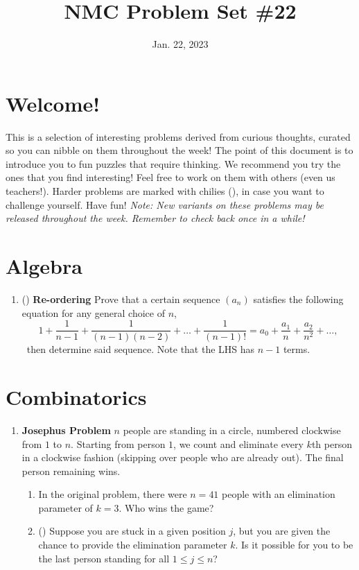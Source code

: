 \documentclass[11pt]{scrartcl}
\begin{document}
\title{NMC Problem Set \#22} %
\date{Jan. 22, 2023} %
\maketitle

\section*{Welcome!}

This is a selection of interesting problems derived from curious thoughts, curated so you can nibble on them throughout the week! The point of this document is to introduce you to fun puzzles that require thinking. We recommend you try the ones that you find interesting! Feel free to work on them with others (even us teachers!). Harder problems are marked with chilies (\fullchili), in case you want to challenge yourself.
\newline\newline
Have fun! \textit{Note: New variants on these problems may be released throughout the week. Remember to check back once in a while!}
    
\section{Algebra}
\begin{enumerate}[label=\textbf{A\arabic*}.]
    \item (\halfchili) \textbf{Re-ordering} \newline
    Prove that a certain sequence $(a_n)$ satisfies the following equation for any general choice of $n$,
    \[ 1 + \frac{1}{n-1} + \frac{1}{(n-1)(n-2)} + \dots + \frac{1}{(n-1)!} = a_0 + \frac{a_1}{n} + \frac{a_2}{n^2} + \dots, \]\
    then determine said sequence. Note that the LHS has $n - 1$ terms.    
\end{enumerate}

\newpage
\section{Combinatorics}
\begin{enumerate}[label=\textbf{C\arabic*}.]
    \item \textbf{Josephus Problem} \newline
    $n$ people are standing in a circle, numbered clockwise from $1$ to $n$. Starting from person $1$, we count and eliminate every $k$th person in a clockwise fashion (skipping over people who are already out). The final person remaining wins.

    \begin{enumerate}
        \item In the original problem, there were $n = 41$ people with an elimination parameter of $k = 3$. Who wins the game?
    
        \item (\fullchili) Suppose you are stuck in a given position $j$, but you are given the chance to provide the elimination parameter $k$. Is it possible for you to be the last person standing for all $1 \leq j \leq n$?
    \end{enumerate}
\end{enumerate}
\end{document}

